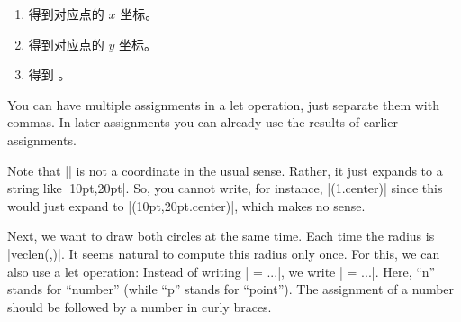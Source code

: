 \eohs

\begin{enumerate}
\item {} 得到对应点的 $x$ 坐标。
\item {} 得到对应点的 $y$ 坐标。
\item {} 得到 。
\end{enumerate}

\bohs

You can have multiple assignments in a let operation, just separate
them with commas. In later assignments you can already use the results
of earlier assignments.

Note that || is not a coordinate in the usual sense. Rather, it
just expands to a string like |10pt,20pt|. So, you cannot write, for
instance, |(\p1.center)| since this would just expand to
|(10pt,20pt.center)|, which makes no sense.

Next, we want to draw both circles at the same time. Each time the
radius is |veclen(,)|. It seems natural to compute this radius
only once. For this, we can also use a let operation: Instead of
writing | = ...|, we write | = ...|. Here, ``n'' stands for
``number'' (while ``p'' stands for ``point''). The assignment of a
number should be followed by a number in curly braces.

\eohs

